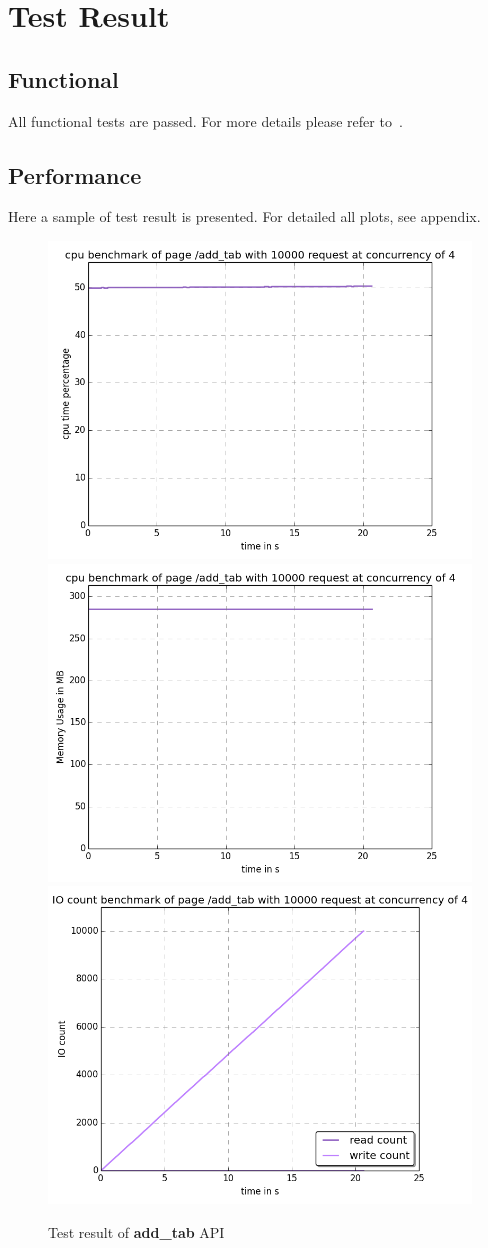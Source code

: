 \section{Test Result}
\label{sec:test_result}
  \subsection{Functional}
    All functional tests are passed. For more details please refer to~.
  \subsection{Performance}
	Here a sample of test result is presented. For detailed all plots, see appendix.
	\begin{figure}[!ht]
		\centering
		\includegraphics[width=0.5\linewidth]{img/add_tab.cpu.png}
		\includegraphics[width=0.5\linewidth]{img/add_tab.mem.png}
		\includegraphics[width=0.5\linewidth]{img/add_tab.io-count.png}
		\caption{Test result of \textbf{add\_tab} API}
	\end{figure}
